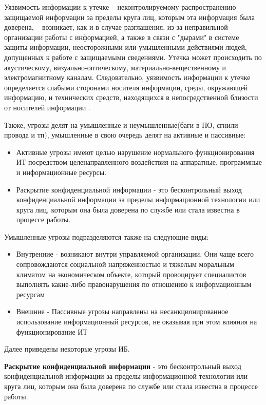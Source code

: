 Уязвимость информации к утечке – неконтролируемому распространению защищаемой информации за пределы круга лиц,
которым эта информация была доверена, – возникает, как и в случае разглашения, из-за неправильной организации
работы с информацией, а также в связи с "дырами" в системе защиты информации, неосторожными или умышленными
действиями людей, допущенных к работе с защищаемыми сведениями. Утечка может происходить по акустическому,
визуально-оптическому, материально-вещественному и электромагнитному каналам. Следовательно, уязвимость
информации к утечке определяется слабыми сторонами носителя информации, среды, окружающей информацию,
и технических средств, находящихся в непосредственной близости от носителей информации \cite{univermvd-eios}.


Также, угрозы делят на умышленные и неумышленные(баги в ПО, сгнили провода и тп), умышленные в свою
очередь делят на активные и пассивные:
\begin{itemize}
    \item Активные угрозы имеют целью нарушение нормального функционирования ИТ посредством
        целенаправленного воздействия на аппаратные, программные и информационные ресурсы.
    \item Раскрытие конфиденциальной информации - это бесконтрольный выход конфиденциальной
        информации за пределы информационной технологии или круга лиц, которым она была доверена по
        службе или стала известна в процессе работы.
\end{itemize}

Умышленные угрозы подразделяются также на следующие виды:
\begin{itemize}
    \item Внутренние - возникают внутри управляемой организации. Они чаще всего сопровождаются
        социальной напряженностью и тяжелым моральным климатом на экономическом объекте, который
        провоцирует специалистов выполнять какие-либо правонарушения по отношению к информационным ресурсам
    \item Внешние - Пассивные угрозы направлены на несанкционированное использование информационный
        ресурсов, не оказывая при этом влияния на функционирование ИТ
\end{itemize}

Далее приведены некоторые угрозы ИБ.

\textbf{Раскрытие конфиденциальной информации} - это бесконтрольный выход конфиденциальной
информации за пределы информационной технологии или круга лиц, которым она была доверена по
службе или стала известна в процессе работы.

